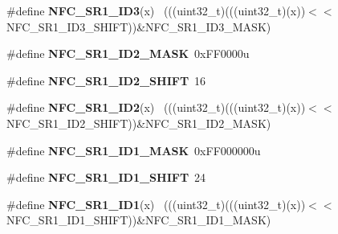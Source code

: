 \begin{DoxyCompactItemize}
\item 
\hypertarget{group___n_f_c___register___masks_gac0c1e7c390ba273f588f6a20d3b87027}{}\#define {\bfseries N\+F\+C\+\_\+\+S\+R1\+\_\+\+I\+D3}(x)                                                  ~(((uint32\+\_\+t)(((uint32\+\_\+t)(x))$<$$<$N\+F\+C\+\_\+\+S\+R1\+\_\+\+I\+D3\+\_\+\+S\+H\+I\+F\+T))\&N\+F\+C\+\_\+\+S\+R1\+\_\+\+I\+D3\+\_\+\+M\+A\+S\+K)\label{group___n_f_c___register___masks_gac0c1e7c390ba273f588f6a20d3b87027}

\item 
\hypertarget{group___n_f_c___register___masks_ga52c0489f793b0bb73be41811eef1ceed}{}\#define {\bfseries N\+F\+C\+\_\+\+S\+R1\+\_\+\+I\+D2\+\_\+\+M\+A\+S\+K}~0x\+F\+F0000u\label{group___n_f_c___register___masks_ga52c0489f793b0bb73be41811eef1ceed}

\item 
\hypertarget{group___n_f_c___register___masks_ga9fa2a1f7e609abb7e59bd15780264598}{}\#define {\bfseries N\+F\+C\+\_\+\+S\+R1\+\_\+\+I\+D2\+\_\+\+S\+H\+I\+F\+T}~16\label{group___n_f_c___register___masks_ga9fa2a1f7e609abb7e59bd15780264598}

\item 
\hypertarget{group___n_f_c___register___masks_ga59d87303378461859f589cac4f6b86e2}{}\#define {\bfseries N\+F\+C\+\_\+\+S\+R1\+\_\+\+I\+D2}(x)                                                  ~(((uint32\+\_\+t)(((uint32\+\_\+t)(x))$<$$<$N\+F\+C\+\_\+\+S\+R1\+\_\+\+I\+D2\+\_\+\+S\+H\+I\+F\+T))\&N\+F\+C\+\_\+\+S\+R1\+\_\+\+I\+D2\+\_\+\+M\+A\+S\+K)\label{group___n_f_c___register___masks_ga59d87303378461859f589cac4f6b86e2}

\item 
\hypertarget{group___n_f_c___register___masks_gaeb1416463494a6bedaec5abf530a658b}{}\#define {\bfseries N\+F\+C\+\_\+\+S\+R1\+\_\+\+I\+D1\+\_\+\+M\+A\+S\+K}~0x\+F\+F000000u\label{group___n_f_c___register___masks_gaeb1416463494a6bedaec5abf530a658b}

\item 
\hypertarget{group___n_f_c___register___masks_ga6c0c2cef50a5831839ed67570512b35a}{}\#define {\bfseries N\+F\+C\+\_\+\+S\+R1\+\_\+\+I\+D1\+\_\+\+S\+H\+I\+F\+T}~24\label{group___n_f_c___register___masks_ga6c0c2cef50a5831839ed67570512b35a}

\item 
\hypertarget{group___n_f_c___register___masks_gab7f4b5f8e0a145536a6a338a175d8a13}{}\#define {\bfseries N\+F\+C\+\_\+\+S\+R1\+\_\+\+I\+D1}(x)                                                  ~(((uint32\+\_\+t)(((uint32\+\_\+t)(x))$<$$<$N\+F\+C\+\_\+\+S\+R1\+\_\+\+I\+D1\+\_\+\+S\+H\+I\+F\+T))\&N\+F\+C\+\_\+\+S\+R1\+\_\+\+I\+D1\+\_\+\+M\+A\+S\+K)\label{group___n_f_c___register___masks_gab7f4b5f8e0a145536a6a338a175d8a13}


\end{DoxyCompactItemize}
